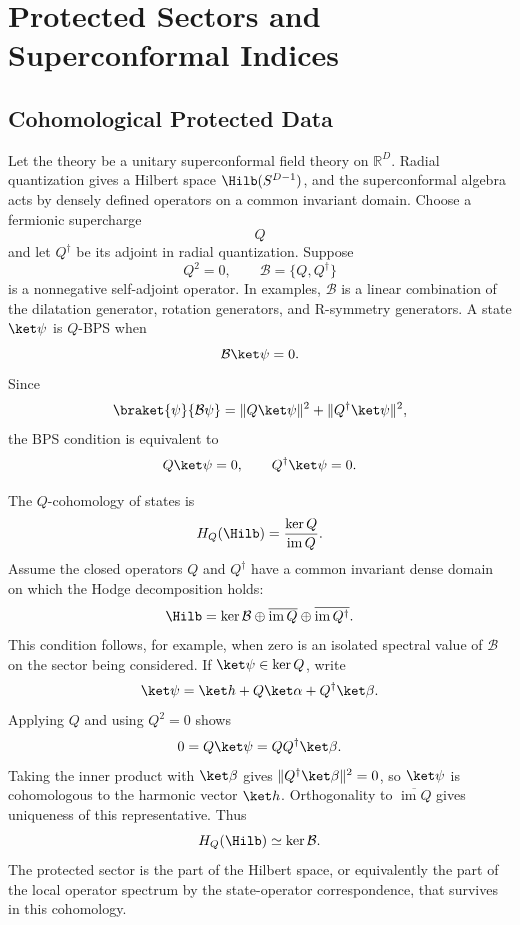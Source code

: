 \chapter{Protected Sectors and Superconformal Indices}
\label{ch:volume-iii-protected-sectors-superconformal-indices}

\section{Cohomological Protected Data}

Let the theory be a unitary superconformal field theory on
\(\mathbb R^D\).  Radial quantization gives a Hilbert space
\(\Hilb(S^{D-1})\), and the superconformal algebra acts by densely defined
operators on a common invariant domain.  Choose a fermionic supercharge
\[
  Q
\]
and let \(Q^\dagger\) be its adjoint in radial quantization.  Suppose
\[
  Q^2=0,
  \qquad
  \mathcal B=\{Q,Q^\dagger\}
  \label{eq:bps-positive-operator}
\]
is a nonnegative self-adjoint operator.  In examples, \(\mathcal B\) is a
linear combination of the dilatation generator, rotation generators, and
R-symmetry generators.  A state \(\ket\psi\) is \(Q\)-BPS when
\[
  \mathcal B\ket\psi=0.
\]
Since
\[
  \braket{\psi}{\mathcal B\psi}
  =
  \|Q\ket\psi\|^2+\|Q^\dagger\ket\psi\|^2,
\]
the BPS condition is equivalent to
\[
  Q\ket\psi=0,
  \qquad
  Q^\dagger\ket\psi=0.
\]

The \(Q\)-cohomology of states is
\begin{equation}
  H_Q(\Hilb)
  =
  \frac{\ker Q}{\operatorname{im} Q}.
  \label{eq:q-cohomology-hilbert-space}
\end{equation}
Assume the closed operators \(Q\) and \(Q^\dagger\) have a common invariant
dense domain on which the Hodge decomposition holds:
\[
  \Hilb
  =
  \ker\mathcal B
  \oplus
  \overline{\operatorname{im}Q}
  \oplus
  \overline{\operatorname{im}Q^\dagger}.
\]
This condition follows, for example, when zero is an isolated spectral value
of \(\mathcal B\) on the sector being considered.  If \(\ket\psi\in\ker Q\),
write
\[
  \ket\psi=\ket h+Q\ket\alpha+Q^\dagger\ket\beta .
\]
Applying \(Q\) and using \(Q^2=0\) shows
\[
  0=Q\ket\psi=QQ^\dagger\ket\beta .
\]
Taking the inner product with \(\ket\beta\) gives
\(\|Q^\dagger\ket\beta\|^2=0\), so \(\ket\psi\) is cohomologous to the
harmonic vector \(\ket h\).  Orthogonality to
\(\overline{\operatorname{im}Q}\) gives uniqueness of this representative.
Thus
\[
  H_Q(\Hilb)\simeq \ker\mathcal B .
\]
The protected sector is the part of the Hilbert space, or equivalently the
part of the local operator spectrum by the state-operator correspondence, that
survives in this cohomology.

